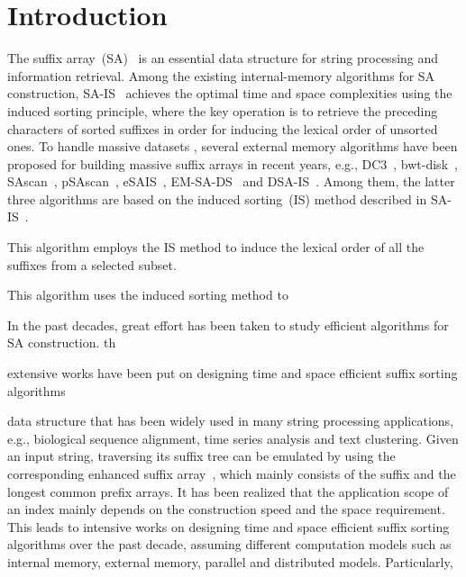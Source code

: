 \documentclass[10pt,journal,compsoc]{IEEEtran}
\begin{document}
\section{Introduction}\label{sec:introduction}


The suffix array~(SA)~\cite{Manber1993} is an essential data structure for string processing and information retrieval. Among the existing internal-memory algorithms for SA construction, SA-IS~\cite{Nong11} achieves the optimal time and space complexities using the induced sorting principle, where the key operation is to retrieve the preceding characters of sorted suffixes in order for inducing the lexical order of unsorted ones. To handle massive datasets , several external memory algorithms have been proposed for building massive suffix arrays in recent years, e.g., DC3~\cite{Dementiev2008a}, bwt-disk~\cite{Ferragina2012}, SAscan~\cite{Karkkainen2014}, pSAscan~\cite{Karkkainen2015}, eSAIS~\cite{Bingmann2013}, EM-SA-DS~\cite{Nong2014} and DSA-IS~\cite{Nong2015}. Among them, the latter three algorithms are based on the induced sorting~(IS) method described in SA-IS~\cite{Nong2011}.


 This algorithm employs the IS method to induce the lexical order of all the suffixes from a selected subset. 

 This algorithm uses the induced sorting method to 

In the past decades, great effort has been taken to study efficient algorithms for SA construction. th

extensive works have been put on designing time and space efficient suffix sorting algorithms

data structure that has been widely used in many string processing applications, e.g., biological sequence alignment, time series analysis and text clustering. Given an input string, traversing its suffix tree can be emulated by using the corresponding enhanced suffix array~\cite{Abouelhodaa2004}, which mainly consists of the suffix and the longest common prefix arrays. It has been realized that the application scope of an index mainly depends on the construction speed and the space requirement. This leads to intensive works on designing time and space efficient suffix sorting algorithms over the past decade, assuming different computation models such as internal memory, external memory, parallel and distributed models. Particularly, 
\end{document}
